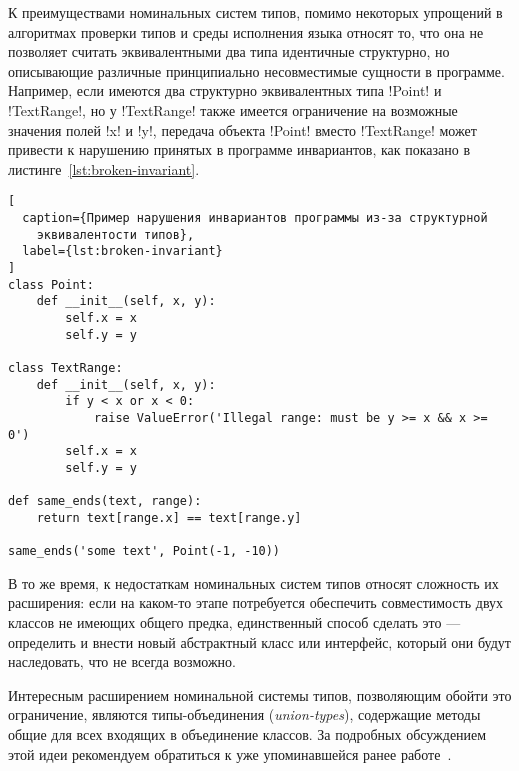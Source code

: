 К преимуществами номинальных систем типов, помимо некоторых упрощений в
алгоритмах проверки типов и среды исполнения языка относят то,
что она не позволяет считать эквивалентными два типа идентичные структурно, но
описывающие различные принципиально несовместимые сущности в программе.
Например, если имеются два структурно эквивалентных типа !Point! и
!TextRange!, но у !TextRange! также имеется ограничение на
возможные значения полей !x! и !y!, передача объекта !Point! вместо
!TextRange! может привести к нарушению принятых в программе инвариантов, как
показано в листинге~\ref{lst:broken-invariant}.

\newpage

\begin{lstlisting}[
  caption={Пример нарушения инвариантов программы из-за структурной
    эквивалентости типов},
  label={lst:broken-invariant}
]
class Point:
    def __init__(self, x, y):
        self.x = x
        self.y = y

class TextRange:
    def __init__(self, x, y):
        if y < x or x < 0:
            raise ValueError('Illegal range: must be y >= x && x >= 0')
        self.x = x
        self.y = y
        
def same_ends(text, range):
    return text[range.x] == text[range.y]

same_ends('some text', Point(-1, -10))
\end{lstlisting}

В то же время, к недостаткам номинальных систем типов относят сложность их
расширения: если на каком-то этапе потребуется обеспечить совместимость двух
классов не имеющих общего предка, единственный способ сделать это --- определить
и внести новый абстрактный класс или интерфейс, который они будут наследовать,
что не всегда возможно.


Интересным расширением номинальной системы типов, позволяющим обойти это
ограничение, являются типы-объединения (\emph{union-types}), содержащие методы
общие для всех входящих в объединение классов. За подробных обсуждением этой
идеи рекомендуем обратиться к уже упоминавшейся ранее
работе~\cite{Igarashi2006}.


